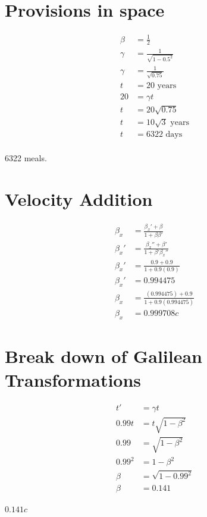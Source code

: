 \documentclass[11pt,letterpaper, twocolumn]{article}
\begin{document}
\section{Provisions in space}
\begin{align*}
    \beta &= \frac{1}{2}\\
    \gamma &= \frac{1}{\sqrt{1-0.5^2}}\\
    \gamma &= \frac{1}{\sqrt{0.75}}\\
    t&=20\text{ years}\\
    20 &= \gamma t\\
    t &= 20 \sqrt{0.75}\\
    t &= 10 \sqrt{3} \text{ years}\\
    t &= 6322 \text{ days}\\
\end{align*}
\begin{center}6322 meals. \end{center}

\section{Velocity Addition}
\begin{align*}
    \beta_x &= \frac{\beta_x' + \beta}{1+\beta\beta'}\\
    \beta_x' &=\frac{\beta_x'' + \beta'}{1+\beta'\beta_x''}\\
    \beta_x' &=\frac{0.9 + 0.9}{1+0.9(0.9)}\\
    \beta_x' &=0.994475\\
    \beta_x &= \frac{(0.994475) + 0.9}{1+0.9(0.994475)}\\
    \beta_x &= 0.999708c
\end{align*}


\section{Break down of Galilean Transformations}
\begin{align*}
    t' &= \gamma t\\
    0.99t &= t\sqrt{1-\beta^2}\\
    0.99 &= \sqrt{1-\beta^2}\\
    0.99^2 &= 1-\beta^2\\
    \beta &= \sqrt{1-0.99^2}\\
    \beta &= 0.141\\
\end{align*}
\begin{center}$0.141c$\end{center}
\end{document}

